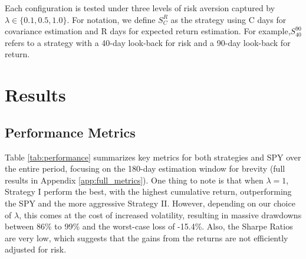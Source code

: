 \documentclass[12pt]{article}
\begin{document}
Each configuration is tested under three levels of risk aversion captured by  $\lambda \in\lbrace0.1, 0.5, 1.0\rbrace$. For notation, we define $S^{R}_{C}$ as the strategy using C days for covariance estimation and R days for expected return estimation. For example,$ S^{90}_{40}$ refers to a strategy with a 40-day look-back for risk and a 90-day look-back for return.


\section{Results}

\subsection{Performance Metrics}

\begin{table}[H]
\centering
\caption{Performance Metrics (180-day Estimation, Whole Period)}
\label{tab:performance}
\end{table}

Table \ref{tab:performance} summarizes key metrics for both strategies and SPY over the entire period, focusing on the 180-day estimation window for brevity (full results in Appendix \ref{app:full_metrics}). One thing to note is that when $\lambda=1$, Strategy I perform the best, with the highest cumulative return, outperforming the SPY and the more aggressive Strategy II. However, depending on our choice of $\lambda$, this comes at the cost of increased volatility, resulting in massive drawdowns between 86\% to 99\% and the worst-case loss of -15.4\%. Also, the Sharpe Ratios are very low, which suggests that the gains from the returns are not efficiently adjusted for risk.
\end{document}
